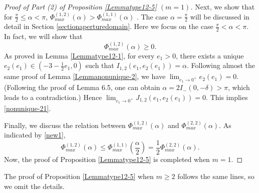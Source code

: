 \documentclass[reqno,12pt]{amsart}
\begin{document}
\begin{proof}[Proof of Part (2) of Proposition \ref{Lemmatype12-5} $(m=1)$]
Next, we show that for $\frac{\pi}{2}\leq \alpha < \pi$, $\Phi_{max}^{(1, 2)}(\alpha)> \Phi_{max}^{(1, 1)}(\alpha)$ . The case $\alpha = \frac{\pi}{2}$ will be discussed in detail in Section \ref{sectionaperturedomain}. Here we focus on the case $\frac{\pi}{2}< \alpha < \pi$. In fact, we will show that 
\begin{equation}\label{nonunique-21}
    \Phi_{max}^{(1, 2)}(\alpha) \geq 0.
\end{equation}
As proved in Lemma \ref{Lemmatype12-1}, for every $e_1>0$, there exists a unique $e_2(e_1)\in (-3 - \frac12 e_1, 0)$ such that
$I_{1, 2}(e_1, e_2(e_1)) =\alpha.$ Following almost the same proof of Lemma \ref{Lemmanonunique-2}, we have $\displaystyle\lim_{e_1 \to 0^+} e_2(e_1) =0.$ (Following the proof of Lemma 6.5, one can obtain $\alpha=2I_-(0,-\delta)>\pi$, which leads to a contradiction.) Hence $\displaystyle \lim_{e_1\to 0^+} J_{1, 2}(e_1, e_2(e_1)) =0$. This implies \eqref{nonunique-21}.

Finally, we discuss the relation between $\Phi_{max}^{(1, 2)}(\alpha)$ and $\Phi_{max}^{(2, 2)}(\alpha)$. As indicated by \eqref{new1}, 
\begin{equation*}
    \Phi_{max}^{(1, 2)}(\alpha) \leq \Phi_{max}^{(1, 1)}\left(\frac{\alpha}{2}\right) = \frac12 \Phi_{max}^{(2, 2)}(\alpha).  
\end{equation*}
Now, the proof of Proposition \ref{Lemmatype12-5} is completed when $m=1$. 
\end{proof}

The proof of Proposition \ref{Lemmatype12-5} when $m\geq 2$ follows the same lines, so we omit the details. 
\end{document}
